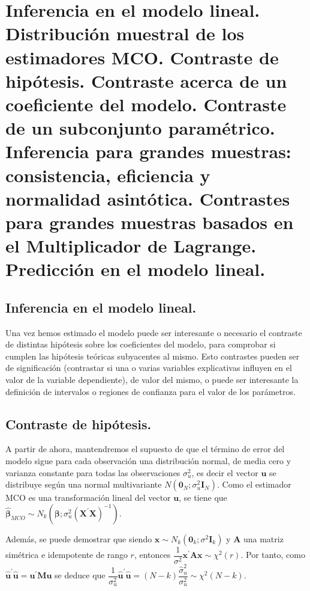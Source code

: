 \chapter[Inferencia en el modelo lineal.]{Inferencia en el modelo lineal. \\ \normalsize Distribuci\'on muestral de los estimadores MCO. Contraste de hip\'otesis. Contraste acerca de un coeficiente del modelo. Contraste de un subconjunto param\'etrico. Inferencia para grandes muestras: consistencia, eficiencia y normalidad asint\'otica. Contrastes para grandes muestras basados en el Multiplicador de Lagrange. Predicci\'on en el modelo lineal.}


\section{Inferencia en el modelo lineal.}

Una vez hemos estimado el modelo puede ser interesante o necesario
el contraste de distintas hip\'otesis sobre los coeficientes del modelo,
para comprobar si cumplen las hip\'otesis te\'oricas subyacentes al mismo.
Esto contrastes pueden ser de significaci\'on (contrastar si una o varias
variables explicativas influyen en el valor de la variable dependiente),
de valor del mismo, o puede ser interesante la definici\'on de intervalos
o regiones de confianza para el valor de los par\'ametros.


\section{Contraste de hip\'otesis.}

A partir de ahora, mantendremos el supuesto de que el t\'ermino de error
del modelo sigue para cada observaci\'on una distribuci\'on normal, de
media cero y varianza constante para todas las observaciones $\sigma_{u}^{2}$,
es decir el vector $\boldsymbol{u}$ se distribuye seg\'un una normal
multivariante $N\left(\boldsymbol{0}_{N};\sigma_{u}^{2}\boldsymbol{I}_{N}\right)$.
Como el estimador MCO es una transformaci\'on lineal del vector $\boldsymbol{u}$,
se tiene que $\hat{\boldsymbol{\beta}}_{MCO}\sim N_{k}\left(\boldsymbol{\beta};\sigma_{u}^{2}\left(\boldsymbol{X}^{\prime}\boldsymbol{X}\right)^{-1}\right)$.

Adem\'as, se puede demostrar que siendo $\boldsymbol{x}\sim N_{k}\left(\boldsymbol{0}_{k};\sigma^{2}\boldsymbol{I}_{k}\right)$
y $\boldsymbol{A}$ una matriz sim\'etrica e idempotente de rango $r$,
entonces $\dfrac{1}{\sigma^{2}}\boldsymbol{x}^{\prime}\boldsymbol{A}\boldsymbol{x}\sim\chi^{2}(r)$.
Por tanto, como $\hat{\boldsymbol{u}}^{\prime}\hat{\boldsymbol{u}}=\boldsymbol{u}^{\prime}\boldsymbol{M}\boldsymbol{u}$
se deduce que $\dfrac{1}{\sigma_{u}^{2}}\hat{\boldsymbol{u}}^{\prime}\hat{\boldsymbol{u}}=\left(N-k\right)\dfrac{\hat{\sigma}_{u}^{2}}{\sigma_{u}^{2}}\sim\chi^{2}(N-k)$.

